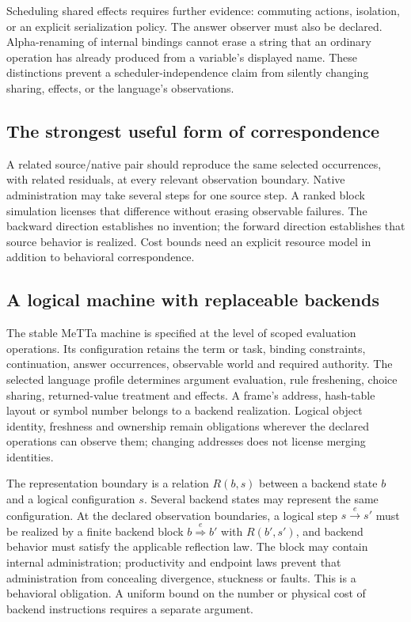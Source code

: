 \documentclass[11pt,a4paper]{article}
\begin{document}
Scheduling shared effects requires further evidence: commuting actions,
isolation, or an explicit serialization policy. The answer observer must also
be declared. Alpha-renaming of internal bindings cannot erase a string that
an ordinary operation has already produced from a variable's displayed name.
These distinctions prevent a scheduler-independence claim from silently
changing sharing, effects, or the language's observations.

\subsection*{The strongest useful form of correspondence}
A related source/native pair should reproduce the same selected occurrences,
with related residuals, at every relevant observation boundary. Native
administration may take several steps for one source step. A ranked block
simulation licenses that difference without erasing observable failures.
The backward direction establishes no invention; the forward direction
establishes that source behavior is realized. Cost bounds need an explicit
resource model in addition to behavioral correspondence.

\subsection*{A logical machine with replaceable backends}

The stable MeTTa machine is specified at the level of scoped evaluation
operations. Its configuration retains the term or task, binding constraints,
continuation, answer occurrences, observable world and required authority.
The selected language profile determines argument evaluation, rule freshening,
choice sharing, returned-value treatment and effects. A frame's address,
hash-table layout or symbol number belongs to a backend realization.
Logical object identity, freshness and ownership remain obligations wherever
the declared operations can observe them; changing addresses does not license
merging identities.

The representation boundary is a relation $R(b,s)$ between a backend state
$b$ and a logical configuration $s$. Several backend states may represent the
same configuration. At the declared observation boundaries, a logical step
$s\xrightarrow{e}s'$ must be realized by a finite backend block
$b\overset{e}{\Longrightarrow}b'$ with $R(b',s')$, and backend behavior must satisfy the
applicable reflection law. The block may contain internal administration;
productivity and endpoint laws prevent that administration from concealing
divergence, stuckness or faults. This is a behavioral obligation. A uniform
bound on the number or physical cost of backend instructions requires a
separate argument.
\end{document}
